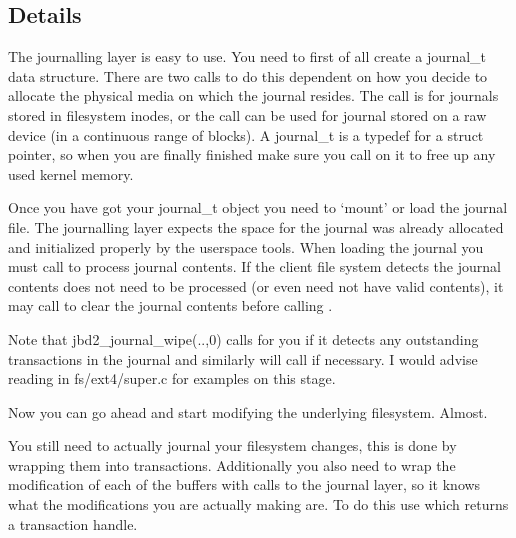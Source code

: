 \documentclass[a4paper,8pt,english]{sphinxmanual}
\begin{document}
\subsection{Details}
\label{filesystems/index:details}
The journalling layer is easy to use. You need to first of all create a
journal\_t data structure. There are two calls to do this dependent on
how you decide to allocate the physical media on which the journal
resides. The {\hyperref[filesystems/index:c.jbd2_journal_init_inode]{\emph{}}} call is for journals stored in
filesystem inodes, or the {\hyperref[filesystems/index:c.jbd2_journal_init_dev]{\emph{}}} call can be used
for journal stored on a raw device (in a continuous range of blocks). A
journal\_t is a typedef for a struct pointer, so when you are finally
finished make sure you call {\hyperref[filesystems/index:c.jbd2_journal_destroy]{\emph{}}} on it to free up
any used kernel memory.

Once you have got your journal\_t object you need to `mount' or load the
journal file. The journalling layer expects the space for the journal
was already allocated and initialized properly by the userspace tools.
When loading the journal you must call {\hyperref[filesystems/index:c.jbd2_journal_load]{\emph{}}} to process
journal contents. If the client file system detects the journal contents
does not need to be processed (or even need not have valid contents), it
may call {\hyperref[filesystems/index:c.jbd2_journal_wipe]{\emph{}}} to clear the journal contents before
calling {\hyperref[filesystems/index:c.jbd2_journal_load]{\emph{}}}.

Note that jbd2\_journal\_wipe(..,0) calls
{\hyperref[filesystems/index:c.jbd2_journal_skip_recovery]{\emph{}}} for you if it detects any outstanding
transactions in the journal and similarly {\hyperref[filesystems/index:c.jbd2_journal_load]{\emph{}}} will
call {\hyperref[filesystems/index:c.jbd2_journal_recover]{\emph{}}} if necessary. I would advise reading
 in fs/ext4/super.c for examples on this stage.

Now you can go ahead and start modifying the underlying filesystem.
Almost.

You still need to actually journal your filesystem changes, this is done
by wrapping them into transactions. Additionally you also need to wrap
the modification of each of the buffers with calls to the journal layer,
so it knows what the modifications you are actually making are. To do
this use {\hyperref[filesystems/index:c.jbd2_journal_start]{\emph{}}} which returns a transaction handle.
\end{document}
